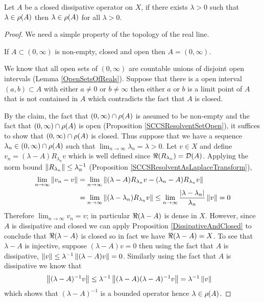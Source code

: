 \begin{lem}\label{ClosedDissipativeResolventSet}Let $A$ be a closed dissipative operator on $X$, if there exists $\lambda > 0$ such that $\lambda \in \rho(A)$ then $\lambda \in \rho(A)$ for all $\lambda > 0$.
\end{lem}
\begin{proof}
We need a simple property of the topology of the real line.
\begin{clm}If $A \subset (0, \infty)$ is non-empty, closed and open then $A = (0,\infty)$.
\end{clm}
We know that all open sets of $(0,\infty)$ are countable unions of disjoint open intervals (Lemma \ref{OpenSetsOfReals}).  Suppose that there is a open interval $(a,b) \subset A$ with either $a\neq 0$ or $b \neq \infty$ then either $a$ or $b$ is a limit point of $A$ that is not contained in $A$ which contradicts the fact that $A$ is closed.

By the claim, the fact that $(0, \infty) \cap \rho(A)$ is assumed to be non-empty and the fact that $(0, \infty) \cap \rho(A)$ is open (Proposition \ref{SCCSResolventSetOpen}), it suffices to show that $(0, \infty) \cap \rho(A)$ is closed.  Thus suppose that we have a sequence 
$\lambda_n \in (0,\infty) \cap \rho(A)$ such that $\lim_{n\to \infty} \lambda_n = \lambda > 0$.  
Let $v \in X$ and define $v_n = (\lambda - A) R_{\lambda_n} v$ which is well defined since $\Re(R_{\lambda_n}) = \mathcal{D}(A)$.  Applying the norm bound $\left \lVert R_{\lambda_n} \right \rVert \leq \lambda_n^{-1}$ (Proposition \ref{SCCSResolventAsLaplaceTransform}),
\begin{align*}
\lim_{n \to \infty} \left \lVert v_n - v \right \rVert &= \lim_{n \to \infty} \left \lVert (\lambda -A) R_{\lambda_n}  v - (\lambda_n - A) R_{\lambda_n} v \right \rVert \\
&=\lim_{n \to \infty} \left \lVert (\lambda -\lambda_n) R_{\lambda_n}  v \right \rVert  \leq \lim_{n \to \infty} \frac{\left \vert \lambda - \lambda_n \right \vert}{\lambda_n} \left \lVert v \right \rVert = 0\\
\end{align*}
Therefore $\lim_{n \to \infty} v_n = v$; in particular $\Re(\lambda - A)$ is dense in $X$.  However, since $A$ is dissipative and closed we can apply Proposition \ref{DissipativeAndClosed} to conclude that $\Re(\lambda - A)$ is closed so in fact we have $\Re(\lambda - A)=X$.  To see that $\lambda - A$ is injective, suppose
$(\lambda - A) v = 0$ then using the fact that $A$ is dissipative, $\left \lVert v \right \rVert \leq \lambda^{-1} \left \lVert (\lambda - A) v \right \rVert = 0$.  Similarly using the fact that $A$ is dissipative
we know that 
\begin{align*}
\left \lVert (\lambda - A)^{-1} v \right \rVert &\leq \lambda^{-1} \left \lVert (\lambda-A)(\lambda - A)^{-1} v \right \rVert = \lambda^{-1} \left \lVert v \right \rVert
\end{align*}
which shows that $(\lambda - A)^{-1}$ is a bounded operator hence $\lambda \in \rho(A)$.
\end{proof}

